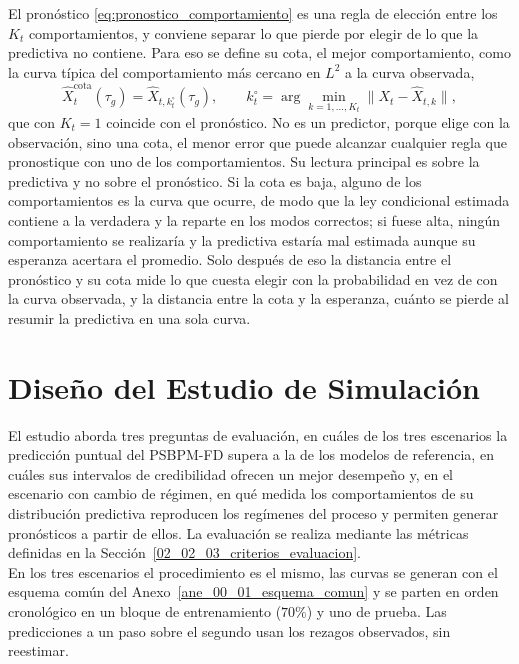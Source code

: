 El pronóstico \eqref{eq:pronostico_comportamiento} es una regla de elección entre los $K_t$ comportamientos, y conviene separar lo que pierde por elegir de lo que la predictiva no contiene. Para eso se define su cota, el mejor comportamiento, como la curva típica del comportamiento más cercano en $L^2$ a la curva observada,
\begin{equation}\label{eq:mejor_comportamiento}
    \widehat{X}_t^{\mathrm{cota}}(\tau_g) = \widehat{X}_{t,k_t^{\circ}}(\tau_g),
    \qquad
    k_t^{\circ} = \arg\min_{k = 1, \ldots, K_t} \bigl\lVert X_t - \widehat{X}_{t,k} \bigr\rVert,
\end{equation}
que con $K_t = 1$ coincide con el pronóstico. No es un predictor, porque elige con la observación, sino una cota, el menor error que puede alcanzar cualquier regla que pronostique con uno de los comportamientos. Su lectura principal es sobre la predictiva y no sobre el pronóstico. Si la cota es baja, alguno de los comportamientos es la curva que ocurre, de modo que la ley condicional estimada contiene a la verdadera y la reparte en los modos correctos; si fuese alta, ningún comportamiento se realizaría y la predictiva estaría mal estimada aunque su esperanza acertara el promedio. Solo después de eso la distancia entre el pronóstico y su cota mide lo que cuesta elegir con la probabilidad en vez de con la curva observada, y la distancia entre la cota y la esperanza, cuánto se pierde al resumir la predictiva en una sola curva.


\section{Diseño del Estudio de Simulación}
\label{03_07_00_diseno_estudio_simulacion}

El estudio aborda tres preguntas de evaluación, en cuáles de los tres escenarios la predicción puntual del PSBPM-FD supera a la de los modelos de referencia, en cuáles sus intervalos de credibilidad ofrecen un mejor desempeño y, en el escenario con cambio de régimen, en qué medida los comportamientos de su distribución predictiva reproducen los regímenes del proceso y permiten generar pronósticos a partir de ellos. La evaluación se realiza mediante las métricas definidas en la Sección~\ref{02_02_03_criterios_evaluacion}.\\

En los tres escenarios el procedimiento es el mismo, las curvas se generan con el esquema común del Anexo~\ref{ane_00_01_esquema_comun} y se parten en orden cronológico en un bloque de entrenamiento ($70\%$) y uno de prueba. Las predicciones a un paso sobre el segundo usan los rezagos observados, sin reestimar.\\

